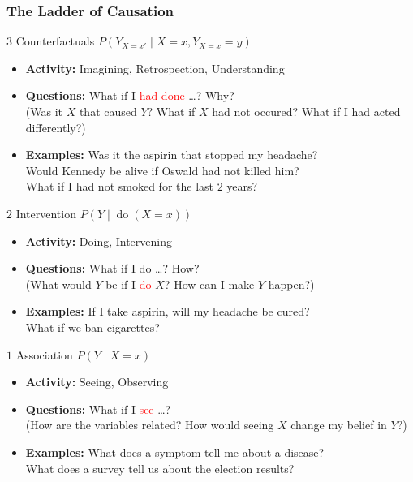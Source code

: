 \documentclass[UTF8,11pt,colorlinks,compress,openany]{beamer}%
\begin{document}
\begin{frame}\frametitle{The Ladder of Causation}
\vspace{-1ex}
\begin{scriptsize}
\begin{block}{$3$ Counterfactuals $P(Y_{X=x'}\mid X=x,Y_{X=x}=y)$}
\begin{itemize}
	\item \textbf{Activity:} Imagining, Retrospection, Understanding
	\item \textbf{Questions:} What if I \textcolor{red}{had done} \dots? Why?\\
	(Was it $X$ that caused $Y$? What if $X$ had not occured? What if I had acted differently?)
	\item \textbf{Examples:} Was it the aspirin that stopped my headache?\\
	Would Kennedy be alive if Oswald had not killed him?\\
	What if I had not smoked for the last $2$ years?
\end{itemize}
\end{block}
\vspace{-1ex}
\begin{block}{$2$ Intervention $P(Y\mid \operatorname{do}(X=x))$}
\begin{itemize}
	\item \textbf{Activity:} Doing, Intervening
	\item \textbf{Questions:} What if I do \dots? How?\\
	(What would $Y$ be if I \textcolor{red}{do} $X$? How can I make $Y$ happen?)
	\item \textbf{Examples:} If I take aspirin, will my headache be cured?\\
	What if we ban cigarettes?
\end{itemize}
\end{block}
\vspace{-1ex}
\begin{block}{$1$ Association $P(Y\mid X=x)$}
\begin{itemize}
	\item \textbf{Activity:} Seeing, Observing
	\item \textbf{Questions:} What if I \textcolor{red}{see} \dots?\\
	(How are the variables related? How would seeing $X$ change my belief in $Y$?)
	\item \textbf{Examples:} What does a symptom tell me about a disease?\\
	What does a survey tell us about the election results?
\end{itemize}
\end{block}
\end{scriptsize}
\end{frame}
\end{document}
